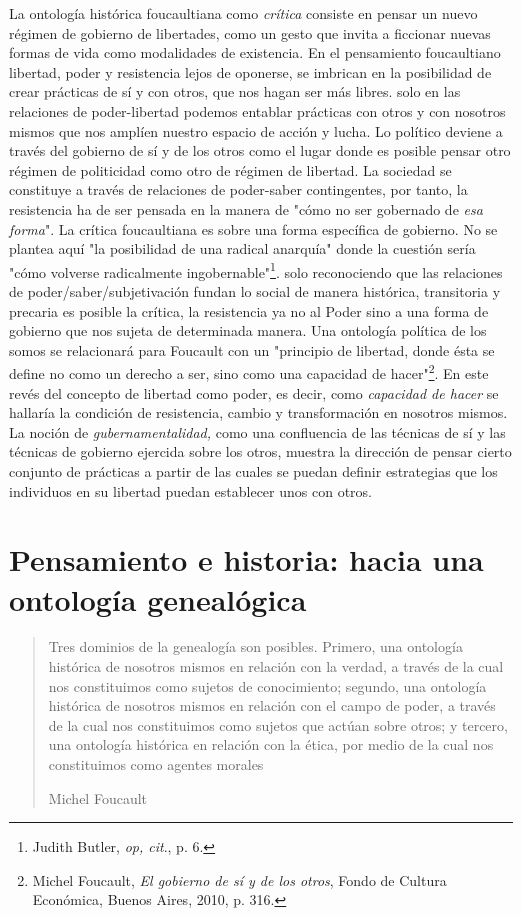 La ontología histórica foucaultiana como \emph{crítica} consiste en
pensar un nuevo régimen de gobierno de libertades, como un gesto que
invita a ficcionar nuevas formas de vida como modalidades de existencia.
En el pensamiento foucaultiano libertad, poder y resistencia lejos de
oponerse, se imbrican en la posibilidad de crear prácticas de sí y con
otros, que nos hagan ser más libres. solo en las relaciones de
poder-libertad podemos entablar prácticas con otros y con nosotros
mismos que nos amplíen nuestro espacio de acción y lucha. Lo político
deviene a través del gobierno de sí y de los otros como el lugar donde
es posible pensar otro régimen de politicidad como otro de régimen de
libertad. La sociedad se constituye a través de relaciones de
poder-saber contingentes, por tanto, la resistencia ha de ser pensada en
la manera de "cómo no ser gobernado de \emph{esa forma}". La crítica
foucaultiana es sobre una forma específica de gobierno. No se plantea
aquí "la posibilidad de una radical anarquía" donde la cuestión sería
"cómo volverse radicalmente ingobernable"\footnote{Judith Butler,
  \emph{op, cit}., p. 6.}. solo reconociendo que las relaciones de
poder/saber/subjetivación fundan lo social de manera histórica,
transitoria y precaria es posible la crítica, la resistencia ya no al
Poder sino a una forma de gobierno que nos sujeta de determinada manera.
Una ontología política de los somos se relacionará para Foucault con un
"principio de libertad, donde ésta se define no como un derecho a ser,
sino como una capacidad de hacer"\footnote{Michel Foucault, \emph{El
  gobierno de sí y de los otros}, Fondo de Cultura Económica, Buenos
  Aires, 2010, p. 316.}. En este revés del concepto de libertad como
poder, es decir, como \emph{capacidad de hacer} se hallaría la condición
de resistencia, cambio y transformación en nosotros mismos. La noción de
\emph{gubernamentalidad,} como una confluencia de las técnicas de sí y
las técnicas de gobierno ejercida sobre los otros, muestra la dirección
de pensar cierto conjunto de prácticas a partir de las cuales se puedan
definir estrategias que los individuos en su libertad puedan establecer
unos con otros.

\section{Pensamiento e historia: hacia una ontología genealógica}

\begin{quote}
Tres dominios de la genealogía son posibles. Primero, una ontología
histórica de nosotros mismos en relación con la verdad, a través de la
cual nos constituimos como sujetos de conocimiento; segundo, una
ontología histórica de nosotros mismos en relación con el campo de
poder, a través de la cual nos constituimos como sujetos que actúan
sobre otros; y tercero, una ontología histórica en relación con la
ética, por medio de la cual nos constituimos como agentes morales

Michel Foucault
\end{quote}

